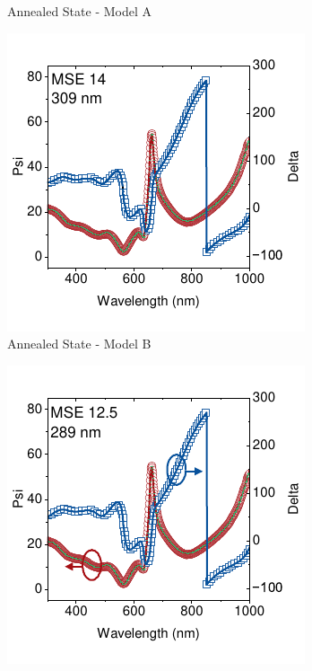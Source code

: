 \begin{figure}[t]
\begin{subfigure}[t]{0.4\textwidth}
        \caption{Annealed State - Model A}
        \label{fig:ellipsometry:static_fits:t23_fixed_thick_50_void}
    \end{subfigure} 
    \begin{subfigure}[t]{0.4\textwidth}
        \centering
        \includegraphics[width=\textwidth]{chapters/ellipsometry/image/t23_fitted_thickness.pdf} %
        \caption{Annealed State - Model B}
        \label{fig:ellipsometry:static_fits:t23_fitted_thick}
    \end{subfigure}
    \hfill
    \begin{subfigure}[t]{0.4\textwidth}
        \centering
        \includegraphics[width=\textwidth]{chapters/ellipsometry/image/t23_fixed_thick_x_void_p.pdf} %

\end{subfigure}
\end{figure}
